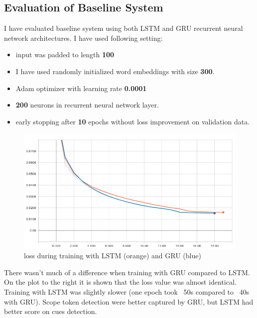 \documentclass{article}
\begin{document}
\subsection{Evaluation of Baseline System}
I have evaluated baseline system using both LSTM and GRU recurrent neural network architectures.
I have used following setting:
\begin{itemize}
\item input was padded to length \textbf{100}
\item I have used randomly initialized word embeddings with size \textbf{300}.
\item Adam optimizer with learning rate \textbf{0.0001}
\item \textbf{200} neurons in recurrent neural network layer.
\item early stopping after \textbf{10} epochs without loss improvement on validation data.
\end{itemize}

\begin{figure}
    \centering
    \includegraphics[scale=0.25]{../figures/loss.png}
    \caption {loss during training with LSTM (orange) and GRU (blue)}
\end{figure}

There wasn't much of a difference when training with GRU compared to LSTM.
On the plot to the right it is shown that the loss value was almost identical.
Training with LSTM was slightly slower (one epoch took ~50s compared to ~40s with GRU).
Scope token detection were better captured by GRU, but LSTM had better score on
cues detection.
\end{document}
